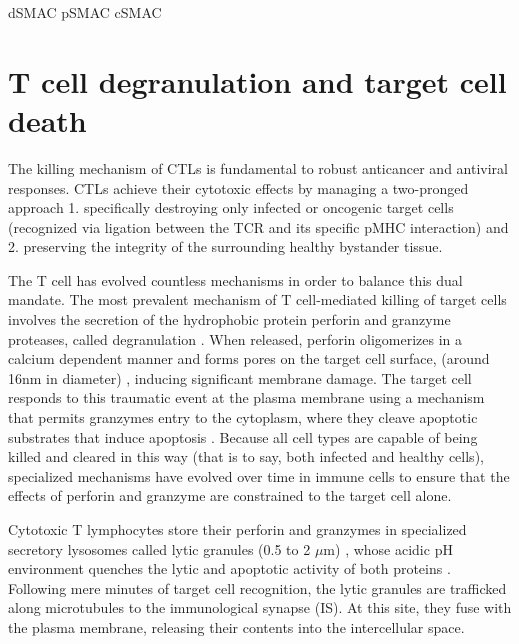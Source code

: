 dSMAC
pSMAC
cSMAC


\section{T cell degranulation and target cell death}
The killing mechanism of CTLs is fundamental to robust anticancer and antiviral responses.  CTLs achieve their cytotoxic effects by managing a two-pronged approach 1. specifically destroying only infected or oncogenic target cells (recognized via ligation between the TCR and its specific pMHC interaction) and 2. preserving the integrity of the surrounding healthy bystander tissue. 

The T cell has evolved countless mechanisms in order to balance this dual mandate. The most prevalent mechanism of T cell-mediated killing of target cells involves the secretion of the hydrophobic protein perforin and granzyme proteases, called degranulation \cite{Dustin2010, Stinchcombe2007}. When released, perforin oligomerizes in a calcium dependent manner \cite{Law2010} and forms pores on the target cell surface, (around 16nm in diameter) \cite{Cartwright2014}, inducing significant membrane damage. The target cell responds to this traumatic event at the plasma membrane using a mechanism that permits granzymes entry to the cytoplasm, where they cleave apoptotic substrates that induce apoptosis \cite{Keefe2005}. Because all cell types are capable of being killed and cleared in this way (that is to say, both infected and healthy cells),  specialized mechanisms have evolved over time in immune cells to ensure that the effects of perforin and granzyme are constrained to the target cell alone.  

Cytotoxic T lymphocytes store their perforin and granzymes in specialized secretory lysosomes called lytic granules (0.5 to 2 $\mu$m) \cite{Sanchez-Ruiz2011}, whose acidic pH environment quenches the lytic and apoptotic activity of both proteins \cite{Thiery2014, Keefe2005}. Following mere minutes of target cell recognition, the lytic granules are trafficked along microtubules to the immunological synapse (IS). At this site, they fuse with the plasma membrane, releasing their contents into the intercellular space.

